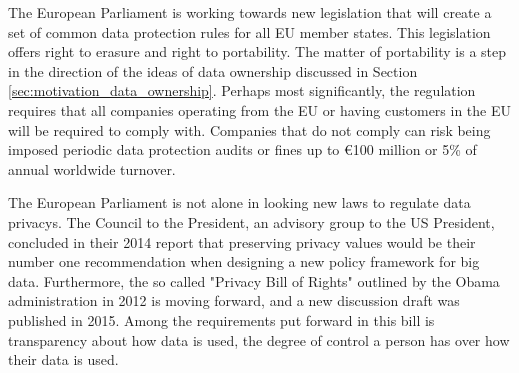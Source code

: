 The European Parliament is working towards new legislation that will create a set of common data protection rules for all EU member states\cite{eudata2013newlegislation}. This legislation offers right to erasure and right to portability. The matter of portability is a step in the direction of the ideas of data ownership discussed in Section \ref{sec:motivation_data_ownership}.  Perhaps most significantly, the regulation requires that all companies operating from the EU or having customers in the EU will be required to comply with. Companies that do not comply can risk being imposed periodic data protection audits or fines up to €100 million or 5\% of annual worldwide turnover.

The European Parliament is not alone in looking new laws to regulate data privacys. The Council to the President, an advisory group to the US President, concluded in their 2014 report \cite{house2014bigdata} that preserving privacy values would be their number one recommendation when designing a new policy framework for big data. Furthermore, the so called "Privacy Bill of Rights" outlined by the Obama administration in 2012 is moving forward, and a new discussion draft was published in 2015\cite{whitehouse2015draft}. Among the requirements put forward in this bill is transparency about how data is used, the degree of control a person has over how their data is used.



\cleardoublepage